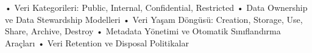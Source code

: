 • Veri Kategorileri: Public, Internal, Confidential, Restricted
• Data Ownership ve Data Stewardship Modelleri
• Veri Yaşam Döngüsü: Creation, Storage, Use, Share, Archive, Destroy
• Metadata Yönetimi ve Otomatik Sınıflandırma Araçları
• Veri Retention ve Disposal Politikalar
